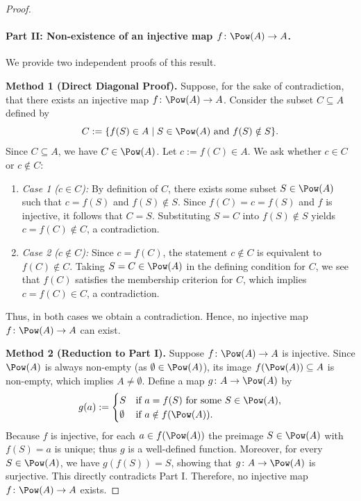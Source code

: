 \begin{proof}
\paragraph{Part II: Non-existence of an injective map $f\colon\Pow(A)\to A$.}
We provide two independent proofs of this result.

\textbf{Method 1 (Direct Diagonal Proof).} Suppose, for the sake of contradiction, that there
exists an injective map $f\colon\Pow(A)\to A$. Consider the subset $C\subseteq A$ defined by
\[ C:=\{f(S)\in A\mid S\in\Pow(A)\text{ and }f(S)\notin S\}. \]
Since $C\subseteq A$, we have $C\in\Pow(A)$. Let $c:=f(C)\in A$. We ask whether $c\in C$ or
$c\notin C$:
\begin{enumerate}[label=(\alph*)]
  \item \emph{Case 1 ($c\in C$):} By definition of $C$, there exists some subset
        $S\in\Pow(A)$ such that $c=f(S)$ and $f(S)\notin S$. Since $f(C)=c=f(S)$ and $f$ is
        injective, it follows that $C=S$. Substituting $S=C$ into $f(S)\notin S$ yields
        $c=f(C)\notin C$, a contradiction.
  \item \emph{Case 2 ($c\notin C$):} Since $c=f(C)$, the statement $c\notin C$ is equivalent to
        $f(C)\notin C$. Taking $S=C\in\Pow(A)$ in the defining condition for $C$, we see that
        $f(C)$ satisfies the membership criterion for $C$, which implies $c=f(C)\in C$, a
        contradiction.
\end{enumerate}
Thus, in both cases we obtain a contradiction. Hence, no injective map $f\colon\Pow(A)\to A$
can exist.

\textbf{Method 2 (Reduction to Part I).} Suppose $f\colon\Pow(A)\to A$ is injective. Since
$\Pow(A)$ is always non-empty (as $\emptyset\in\Pow(A)$), its image $f(\Pow(A))\subseteq A$ is
non-empty, which implies $A\neq\emptyset$. Define a map $g\colon A\to\Pow(A)$ by
\[ g(a):=\begin{cases}
  S & \text{if } a=f(S) \text{ for some } S\in\Pow(A),\\
  \emptyset & \text{if } a\notin f(\Pow(A)).
\end{cases} \]
Because $f$ is injective, for each $a\in f(\Pow(A))$ the preimage $S\in\Pow(A)$ with $f(S)=a$
is unique; thus $g$ is a well-defined function. Moreover, for every $S\in\Pow(A)$, we have
$g(f(S))=S$, showing that $g\colon A\to\Pow(A)$ is surjective. This directly contradicts
Part I. Therefore, no injective map $f\colon\Pow(A)\to A$ exists.
\end{proof}
